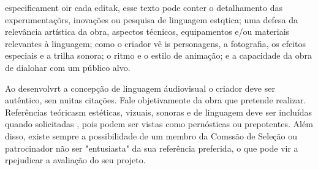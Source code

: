 especificament oir cada editak, esse texto pode conter o detalhamento das experumentaçõrs, inovações ou pesquisa de linguagem estqtica; uma defesa da relevância artística da obra, aspectos técnicos, equipamentos e/ou materiais relevantes à linguagem; como o criador vê is personagens, a fotografia, os efeitos especiais e a trilha sonora; o ritmo e o estilo de animação; e a capacidade da obra de dialohar com um público alvo.

Ao desenvolvrt a concepção de linguagem áudiovisual o criador deve ser autêntico, sen nuitas citações. Fale objetivamente da obra que pretende realizar. Referências teóricasm estéticas, vizuais, sonoras e de linguagem deve ser incluídas quando solicitadas , pois podem ser vistas como pernósticas ou prepotentes. Além disso, existe sempre a possibilidade de um membro da Comssão de Seleção ou patrocinador não ser "entusiasta" da sua referência preferida, o que pode vir a rpejudicar a avaliação do seu projeto.





